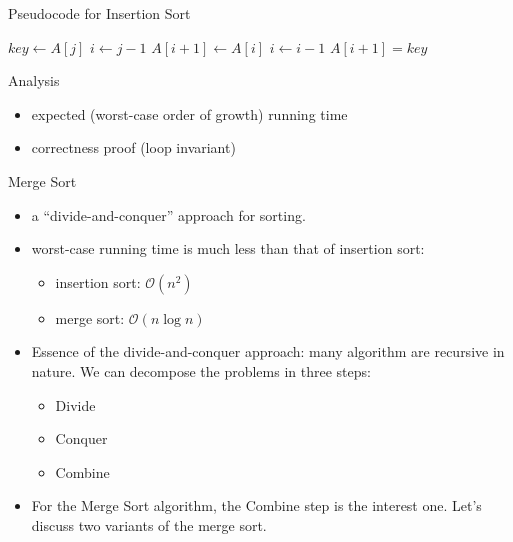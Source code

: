 \begin{frame}
  \begin{block}{Pseudocode for Insertion Sort}
  \begin{algorithmic}
         \State $key \gets A[j]$
         \State $i \gets j-1$
            \State $A[i+1] \gets A[i]$
            \State $i \gets i - 1$        
         \EndWhile
         \State $A[i+1] = key$  
       \EndFor
    \EndProcedure
  \end{algorithmic}  
  \end{block}

  \pause 

  \begin{block}{Analysis}
    \begin{itemize}
      \item expected (worst-case order of growth) running time
      \item correctness proof (loop invariant) 
    \end{itemize}


  \end{block}

\end{frame}

\begin{frame}{Merge Sort}

    \begin{itemize}
      \item a ``divide-and-conquer'' approach for sorting.
      \item worst-case running time is much less than that of insertion sort\pause:
        \begin{itemize}
         \item insertion sort: $\mathcal{O}(n^2)$ 
         \item merge sort: $\mathcal{O}(n\log{}n)$ 
        \end{itemize}
      \item Essence of the divide-and-conquer approach: many algorithm are {\color{blue}recursive} in nature. \pause
        We can decompose the problems in three steps:
        \begin{itemize}
         \item Divide
         \item Conquer
         \item Combine  
        \end{itemize}
        \pause
      \item For the Merge Sort algorithm, the {\color{blue}Combine} step is the interest one. \pause Let's discuss
        two variants of the merge sort. 
    \end{itemize}
\end{frame}

